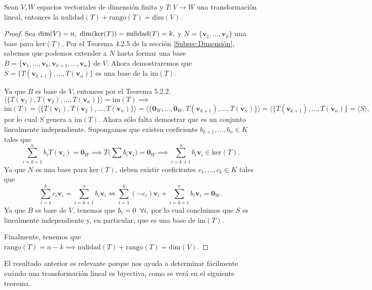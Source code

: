 \documentclass[12pt]{article}
\newenvironment{teorema}[2][Teorema]{\begin{trivlist}
\item[\hskip \labelsep {\bfseries #1}\hskip \labelsep {\bfseries #2.}]}{\end{trivlist}}
\begin{document}
\begin{teorema} {5.3.1}
    Sean $V,W$ espacios vectoriales de dimensión finita y $T:V\to W$ una transformación lineal, entonces la $\text{nulidad}(T)+\text{rango}(T)=\text{dim}(V).$

\begin{proof}
    Sea $\text{dim}(V)=n, \hspace{1mm} \text{dim}(\text{ker}(T))=\text{nulidad}(T)=k,$ y $N=\{\mathbf{v}_1, ..., \mathbf{v}_k\}$ una base para  $\text{ker}(T)$. Por el Teorema 4.2.5 de la sección \ref{Subsec:Dimensión}, sabemos que podemos extender a $N$ hasta formar una base $B=\{\mathbf{v}_1, ..., \mathbf{v}_k, \mathbf{v}_{k+1}, ..., \mathbf{v}_n\}$ de $V$. Ahora demostraremos que $S=\{T(\mathbf{v}_{k+1}), ...,T(\mathbf{v}_n)\}$ es una base de la $\text{im}(T)$.

    Ya que $B$ es base de $V$, entonces por el Teorema 5.2.2. $\langle \{T(\mathbf{v}_1),T(\mathbf{v}_2),...,T(\mathbf{v}_n)\} \rangle =\text{im}(T) \implies$ $$\text{im}(T)=\langle \{T(\mathbf{v}_1),T(\mathbf{v}_2),...,T(\mathbf{v}_n)\} \rangle = \langle \{\mathbf{0}_W,...,\mathbf{0}_W,T(\mathbf{v}_{k+1}),...,T(\mathbf{v}_n)\}\rangle = \langle \{T(\mathbf{v}_{k+1}),...,T(\mathbf{v}_n)\} = \langle S \rangle, $$ \noindent por lo cual $S$ genera a $\text{im}(T)$. Ahora sólo falta demostrar que es un conjunto linealmente independiente. Supongamos que existen coeficiente $b_{k+1},...,b_n\in K$ tales que \[
        \sum_{i=k+1}^n b_iT(\mathbf{v}_i)=\mathbf{0}_W \implies T\bigg(\sum b_i\mathbf{v}_i \bigg) = \mathbf{0}_W \implies \sum_{i=k+1}^n b_i\mathbf{v}_i \in \text{ker}(T)
        .\] \noindent Ya que $N$ es una base para $\text{ker}(T)$, deben existir coeficientes $c_1,...,c_k\in K$ tales que \[
    \sum_{i=1}^k c_i\mathbf{v}_i = \sum_{i=k+1}^n b_i\mathbf{v}_i \iff \sum_{i=1}^k (-c_i)\mathbf{v}_i + \sum_{i=k+1}^n b_i \mathbf{v}_i = \mathbf{0}_W
.\] \noindent Ya que $B$ es base de $V$, tenemos que $b_i=0\hspace{2mm} \forall i,$ por lo cual concluimos que $S$ es linealmente independiente y, en particular, que es una base de $\text{im}(T)$.

    Finalmente, tenemos que $\text{rango}(T) = n-k\implies \text{nulidad}(T)+\text{rango}(T)=\text{dim}(V).$
\end{proof}

\end{teorema}

El resultado anterior es relevante porque nos ayuda a determinar fácilmente cuándo una transformación lineal es biyectiva, como se verá en el siguiente teorema.
\end{document}
